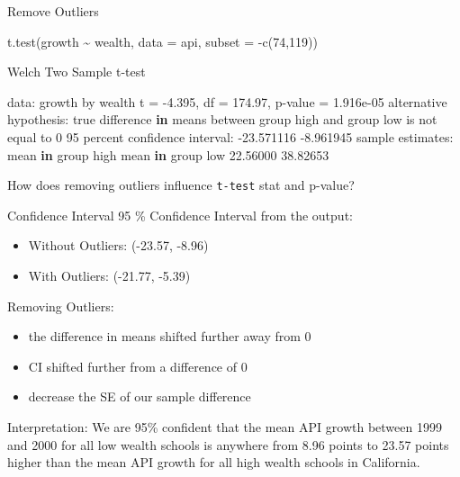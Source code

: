\documentclass[
  10pt,
  ignorenonframetext,
]{beamer}
\newenvironment{Shaded}{\begin{snugshade}}{\end{snugshade}}
\newcommand{\AttributeTok}[1]{\textcolor[rgb]{0.77,0.63,0.00}{#1}}
\newcommand{\ControlFlowTok}[1]{\textcolor[rgb]{0.13,0.29,0.53}{\textbf{#1}}}
\newcommand{\DecValTok}[1]{\textcolor[rgb]{0.00,0.00,0.81}{#1}}
\newcommand{\FloatTok}[1]{\textcolor[rgb]{0.00,0.00,0.81}{#1}}
\newcommand{\FunctionTok}[1]{\textcolor[rgb]{0.00,0.00,0.00}{#1}}
\newcommand{\NormalTok}[1]{#1}
\newcommand{\OtherTok}[1]{\textcolor[rgb]{0.56,0.35,0.01}{#1}}
\newcommand{\SpecialCharTok}[1]{\textcolor[rgb]{0.00,0.00,0.00}{#1}}
\providecommand{\tightlist}{%
  \setlength{\itemsep}{0pt}\setlength{\parskip}{0pt}}
\let\oldShaded\Shaded
\let\endoldShaded\endShaded
\renewenvironment{Shaded}{\tiny\oldShaded}{\endoldShaded}
\begin{document}
\begin{frame}[fragile]{Remove Outliers}
\protect\hypertarget{remove-outliers}{}
\begin{Shaded}
\begin{Highlighting}[]
\FunctionTok{t.test}\NormalTok{(growth }\SpecialCharTok{\textasciitilde{}}\NormalTok{ wealth, }\AttributeTok{data =}\NormalTok{ api, }\AttributeTok{subset =} \SpecialCharTok{{-}}\FunctionTok{c}\NormalTok{(}\DecValTok{74}\NormalTok{,}\DecValTok{119}\NormalTok{))}

\NormalTok{    Welch Two Sample t}\SpecialCharTok{{-}}\NormalTok{test}

\NormalTok{data}\SpecialCharTok{:}\NormalTok{  growth by wealth}
\NormalTok{t }\OtherTok{=} \SpecialCharTok{{-}}\FloatTok{4.395}\NormalTok{, df }\OtherTok{=} \FloatTok{174.97}\NormalTok{, p}\SpecialCharTok{{-}}\NormalTok{value }\OtherTok{=} \FloatTok{1.916e{-}05}
\NormalTok{alternative hypothesis}\SpecialCharTok{:}\NormalTok{ true difference }\ControlFlowTok{in}\NormalTok{ means between group high and group low is not equal to }\DecValTok{0}
\DecValTok{95}\NormalTok{ percent confidence interval}\SpecialCharTok{:}
 \SpecialCharTok{{-}}\FloatTok{23.571116}  \SpecialCharTok{{-}}\FloatTok{8.961945}
\NormalTok{sample estimates}\SpecialCharTok{:}
\NormalTok{mean }\ControlFlowTok{in}\NormalTok{ group high  mean }\ControlFlowTok{in}\NormalTok{ group low }
          \FloatTok{22.56000}           \FloatTok{38.82653} 
\end{Highlighting}
\end{Shaded}

How does removing outliers influence \texttt{t-test} stat and p-value?
\end{frame}

\begin{frame}{Confidence Interval}
\protect\hypertarget{confidence-interval}{}
95 \% Confidence Interval from the output:

\begin{itemize}
\tightlist
\item
  Without Outliers: (-23.57, -8.96)
\item
  With Outliers: (-21.77, -5.39)
\end{itemize}

Removing Outliers:

\begin{itemize}
\tightlist
\item
  the difference in means shifted further away from 0
\item
  CI shifted further from a difference of 0
\item
  decrease the SE of our sample difference
\end{itemize}

Interpretation: We are 95\% confident that the mean API growth between
1999 and 2000 for all low wealth schools is anywhere from 8.96 points to
23.57 points higher than the mean API growth for all high wealth schools
in California.
\end{frame}
\end{document}
